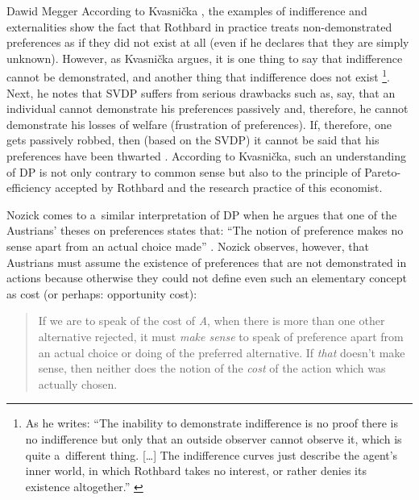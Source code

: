 \begin{artengenv}{Dawid Megger}
According to Kvasnička 
\parencite*[][]{kvasnicka_rothbards_2008}, %
 the examples of indifference and externalities show the fact that Rothbard in practice treats non-demonstrated preferences as if they did not exist at all (even if he declares that they are simply unknown). However, as Kvasnička argues, it is one thing to say that indifference cannot be demonstrated, and another thing that indifference does not exist 
\parencite[][p.44]{kvasnicka_rothbards_2008}%
\footnote{As he writes: ``The inability to demonstrate indifference is no proof there is no indifference but only that an outside observer cannot observe it, which is quite a~different thing. […] The indifference curves just describe the agent's inner world, in which Rothbard takes no interest, or rather denies its existence altogether.'' 
\parencite[][p.44]{kvasnicka_rothbards_2008}%
}. Next, he notes that SVDP suffers from serious drawbacks such as, say, that an individual cannot demonstrate his preferences passively and, therefore, he cannot demonstrate his losses of welfare (frustration of preferences). If, therefore, one gets passively robbed, then (based on the SVDP) it cannot be said that his preferences have been thwarted 
\parencite[][pp.45–46]{kvasnicka_rothbards_2008}. %
 According to Kvasnička, such an understanding of DP is not only contrary to common sense but also to the principle of Pareto-efficiency accepted by Rothbard and the research practice of this economist.



Nozick comes to a~similar interpretation of DP when he argues that one of the Austrians' theses on preferences states that: ``The notion of preference makes no sense apart from an actual choice made'' 
\parencite[][p.370]{nozick_austrian_1977}. %
 Nozick observes, however, that Austrians must assume the existence of preferences that are not demonstrated in actions because otherwise they could not define even such an elementary concept as cost (or perhaps: opportunity cost):



\begin{quote}
If we are to speak of the cost of \textit{A}, when there is more than one other alternative rejected, it must \textit{make sense} to speak of preference apart from an actual choice or doing of the preferred alternative. If \textit{that} doesn't make sense, then neither does the notion of the \textit{cost} of the action which was actually chosen. 
\parencite[][p.373]{nozick_austrian_1977}%
\end{quote}





\end{artengenv}
